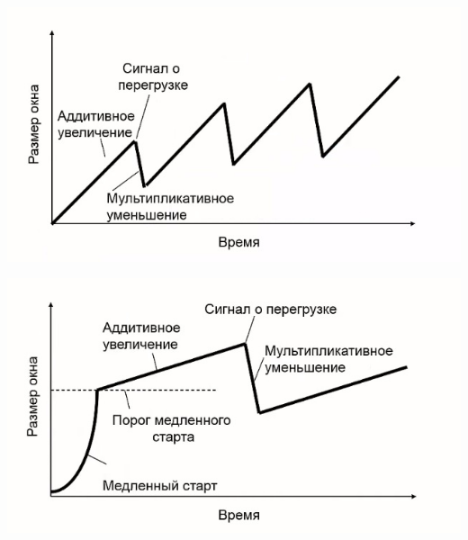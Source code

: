 \includegraphics[width=0.75\columnwidth]{pics/dop16_add.jpg}

\includegraphics[width=0.75\columnwidth]{pics/dop16_mul.jpg}

